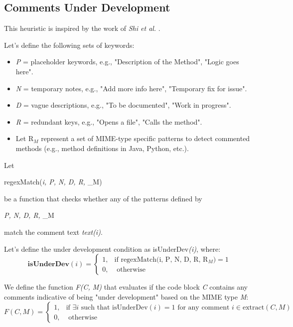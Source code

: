 \subsection{Comments Under Development}
This heuristic is inspired by the work of \textit{Shi et al.} \cite{buildingRock}.

\noindent Let's define the following sets of keywords:
	\begin{itemize}
		\item \textit{P} = placeholder keywords, e.g., "Description of the Method", "Logic goes here".
		\item \textit{N} = temporary notes, e.g., "Add more info here", "Temporary fix for issue".
		\item \textit{D} = vague descriptions, e.g., "To be documented", "Work in progress".
		\item \textit{R} = redundant keys, e.g., "Opens a file", "Calls the method".
		\item Let $\mathrm{R}_{M}$ represent a set of MIME-type specific patterns to detect commented methods (e.g., method definitions in Java, Python, etc.).
	\end{itemize}
	
\noindent Let\begin{math*}
	regexMatch(\textit{i, P, N, D, R, } _{M})
\end{math*} be a function that checks whether any of the patterns defined by \begin{math*}\textit{P, N, D, R, } _{M} \end{math*} match the comment text \textit{text(i)}.

\noindent Let's define the under development condition as isUnderDev\textit{(i)}, where:
\begin{equation*}
	\textbf{isUnderDev}(i) = \begin{cases}
		1, & \text{if } \text{regexMatch(i, P, N, D, R, }  \mathrm{R}_{M}) = 1 \\
		0, & \text{ otherwise}
	\end{cases}
\end{equation*}

\noindent We define the function \textit{F(C, M)} that evaluates if the code block \textit{C} contains any comments indicative of being "under development" based on the MIME type \textit{M}:
\begin{equation*}
	F(C, M) = \begin{cases}
		1, & \text{if } \exists i \text{ such that } \text{isUnderDev}(i) = 1 \text{ for any comment } i \in \text{extract}(C, M) \\
		0, & \text{ otherwise}
	\end{cases}
\end{equation*}

